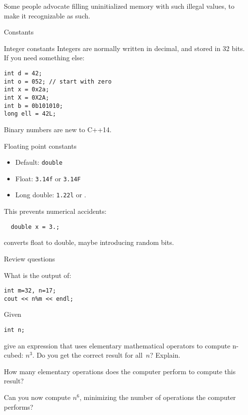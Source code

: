 Some people advocate filling uninitialized memory with such illegal
values, to make it recognizable as such.

 {Constants}

\begin{block}{Integer constants}
  \label{sl:intvals}
  Integers are normally  written in decimal, and stored in 32 bits.
  If you need something else:
\begin{lstlisting}
int d = 42;
int o = 052; // start with zero
int x = 0x2a;
int X = 0X2A;
int b = 0b101010;
long ell = 42L;
\end{lstlisting}
\end{block}

Binary numbers are new to C++14.

\begin{block}{Floating point constants}
  \label{sl:float-vars}
  \begin{itemize}
  \item Default: \lstinline{double}
  \item Float: \lstinline{3.14f} or \lstinline{3.14F}
  \item Long double: \lstinline{1.22l} or .
  \end{itemize}
  This prevents numerical accidents: 
\begin{lstlisting}
  double x = 3.;
\end{lstlisting}
  converts float to double, maybe introducing random bits.
\end{block}

 {Review questions}

\begin{exercise}
  \label{ex:cpp-mod}
What is the output of:
\begin{lstlisting}
int m=32, n=17;
cout << n%m << endl;
\end{lstlisting}
\end{exercise}

\begin{exercise}
  \label{ex:cpp-cube}
  Given
\begin{lstlisting}
int n;
\end{lstlisting}
give an expression that
uses elementary mathematical operators to compute n-cubed: $n^3$.
Do you get the correct result for all~$n$? Explain.

How many elementary operations does the computer perform to compute
this result?

Can you now compute $n^6$, minimizing the number of operations the
computer performs?
\end{exercise}
